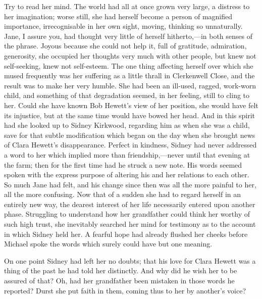 {}Try to read her mind. The world had all at once grown very large, a
distress to her imagination; worse still, she had herself become a
person of magnified importance, irrecognisable in her own sight, moving,
thinking so unnaturally. Jane, I assure you, had thought very little of
herself hitherto,---in both senses of the phrase. Joyous because she
could not help it, full of gratitude, admiration, generosity, she
occupied her thoughts very much with other people, but knew not
self-seeking, knew not self-esteem. The one thing affecting herself over
which she mused frequently was her suffering as a little thrall in
Clerkenwell Close, and the result was to make her very humble. She had
been an ill-used, ragged, work-worn child, and something of that
degradation seemed, in her feeling, still to cling to her. Could she
have known Bob Hewett's view of her position, she would have felt its
injustice, but at the same time would have bowed her head. And in this
spirit had she looked up to Sidney Kirkwood, regarding him as when she
was a child, save for that subtle {}modification which began on the day
when she brought news of Clara Hewett's disappearance. Perfect in
kindness, Sidney had never addressed a word to her which implied more
than friendship,---never until that evening at the farm; then for the
first time had he struck a new note. His words seemed spoken with the
express purpose of altering his and her relations to each other. So much
Jane had felt, and his change since then was all the more painful to
her, all the more confusing. Now that of a sudden she had to regard
herself in an entirely new way, the dearest interest of her life
necessarily entered upon another phase. Struggling to understand how her
grandfather could think her worthy of such high trust, she inevitably
searched her mind for testimony as to the account in which Sidney held
her. A fearful hope had already flushed her cheeks before Michael spoke
the words which surely could have but one meaning.

On one point Sidney had left her no doubts; that his love for Clara
Hewett was a thing of the past he had told her distinctly. And why {}did
he wish her to be assured of that? Oh, had her grandfather been mistaken
in those words he reported? Durst she put faith in them, coming thus to
her by another's voice?

